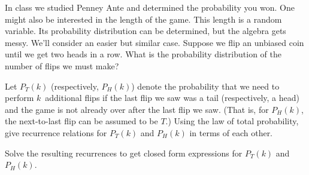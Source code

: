 \documentclass[11pt, twoside]{article}
\begin{document}
\begin{problems}

\problem  {}
In class we studied Penney Ante and determined the probability you
won.  One might also be interested in the length of the game. This
length is a random variable.  Its probability distribution can be
determined, but the algebra gets messy.  We'll consider an easier but
similar case.  Suppose we flip an unbiased coin until we get two heads
in a row.  What is the probability distribution of the number of flips
we must make?

\begin{problemparts}
  \ppart Let $P_T(k)$ (respectively, $P_H(k)$) denote the probability
  that we need to perform $k$~additional flips if the last flip we saw
  was a tail (respectively, a head) and the game is not already over after the last flip we saw. (That is, for $P_H(k)$, the next-to-last flip can be assumed to be $T$.) Using the law of total
  probability, give recurrence relations for $P_T(k)$ and $P_H(k)$ in
  terms of each other.


  \ppart Solve the resulting recurrences to get closed form
  expressions for $P_T(k)$ and $P_H(k)$.


\end{problemparts}
\end{problems}
\end{document}
